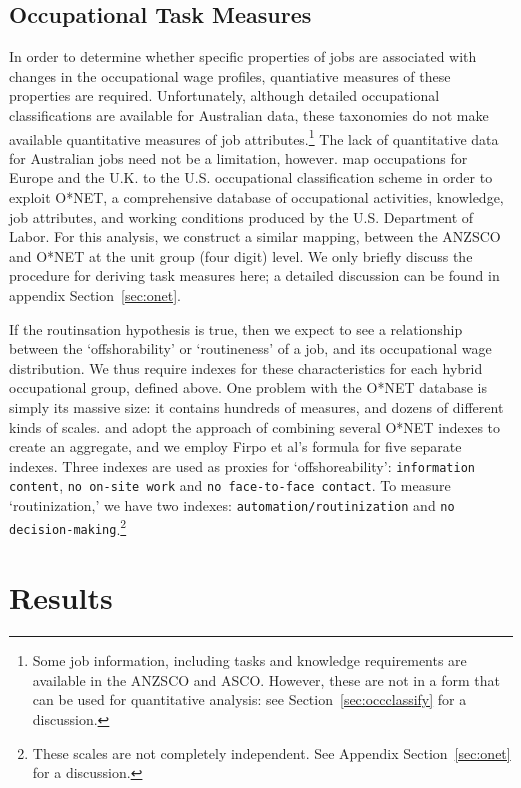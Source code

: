 \subsection{Occupational Task Measures}

In order to determine whether specific properties of jobs are associated with changes in the occupational wage profiles, quantiative measures of these properties are required. Unfortunately, although detailed occupational classifications are available for Australian data, these taxonomies do not make available quantitative measures of job attributes.\footnote{Some job information, including tasks and knowledge requirements are available in the ANZSCO and ASCO. However, these are not in a form that can be used for quantitative analysis: see Section~\ref{sec:occclassify} for a discussion.} The lack of quantitative data for Australian jobs need not be a limitation, however. \citet{Goos2009} map occupations for Europe and the U.K. to the U.S. occupational classification scheme in order to exploit O*NET, a comprehensive database of occupational activities, knowledge, job attributes, and working conditions produced by the U.S. Department of Labor. For this analysis, we construct a similar mapping, between the ANZSCO and O*NET at the unit group (four digit) level. We only briefly discuss the procedure for deriving task measures here; a detailed discussion can be found in appendix Section~\ref{sec:onet}.

If the routinsation hypothesis is true, then we expect to see a relationship between the `offshorability' or `routineness' of a job, and its occupational wage distribution. We thus require indexes for these characteristics for each hybrid occupational group, defined above. One problem with the O*NET database is simply its massive size: it contains hundreds of measures, and dozens of different kinds of scales. \citet{Jensen2010} and \citet{Firpo2011} adopt the approach of combining several O*NET indexes to create an aggregate, and we employ Firpo et al's formula for five separate indexes. Three indexes are used as proxies for `offshoreability': {\tt information content}, {\tt no on-site work} and {\tt no face-to-face contact}. To measure `routinization,' we have two indexes: {\tt automation/routinization} and {\tt no decision-making}.\footnote{These scales are not completely independent. See Appendix Section~\ref{sec:onet} for a discussion.}

\section{Results}

